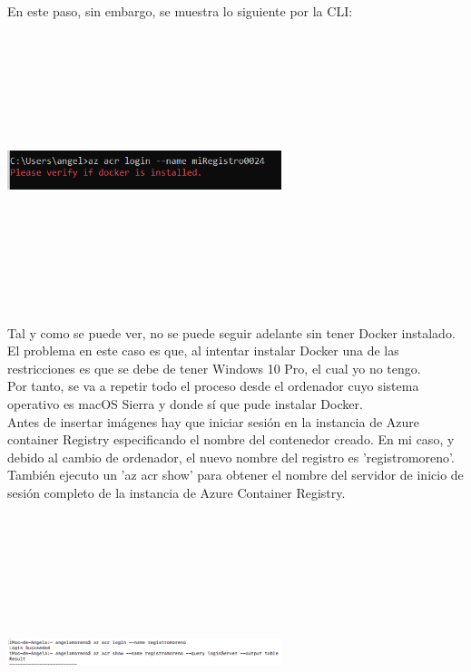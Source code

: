 \documentclass[english,runningheads,a4paper]{llncs}[2018/03/10]
\newenvironment{nscenter}
 {\parskip=0pt\par\nopagebreak\centering}
 {\par\noindent\ignorespacesafterend}
\begin{document}
En este paso, sin embargo, se muestra lo siguiente por la CLI:
\newline
\begin{nscenter}
\includegraphics[width=8cm,height=8cm,keepaspectratio]{./Contenedores/Azure/9.png}
\end{nscenter}
\newline
Tal y como se puede ver, no se puede seguir adelante sin tener Docker instalado.
\\ El problema en este caso es que, al intentar instalar Docker una de las 
restricciones es que se debe de tener Windows 10 Pro, el cual yo no tengo. \\
Por tanto, se va a repetir todo el proceso desde el ordenador cuyo sistema 
operativo es macOS Sierra y donde sí que pude instalar Docker. \\
Antes de insertar imágenes hay que iniciar sesión en la instancia de Azure 
container Registry especificando el nombre del contenedor creado. En mi caso, 
y debido al cambio de ordenador, el nuevo nombre del registro es 
'registromoreno'. \\ También ejecuto un 'az acr show' para obtener el nombre del
servidor de inicio de sesión completo de la instancia de Azure Container 
Registry.
\newline
\begin{nscenter}
\includegraphics[width=8cm,height=8cm,keepaspectratio]{./Contenedores/Azure/51.png}
\end{nscenter}
\end{document}
